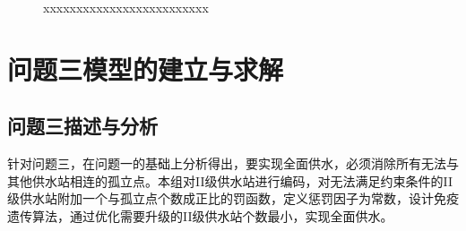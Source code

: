 \documentclass{whutmod}
\begin{document}
			\begin{figure}[H]	
				\centering
				\caption{xxxxxxxxxxxxxxxxxxxxxxxxx}
				\label{fisg}
			\end{figure}

    \section{问题三模型的建立与求解}

   		
    \subsection{问题三描述与分析}
    针对问题三，在问题一的基础上分析得出，要实现全面供水，必须消除所有无法与其他供水站相连的孤立点。本组对II级供水站进行编码，对无法满足约束条件的II级供水站附加一个与孤立点个数成正比的罚函数，定义惩罚因子为常数，设计免疫遗传算法，通过优化需要升级的II级供水站个数最小，实现全面供水。
\end{document}
